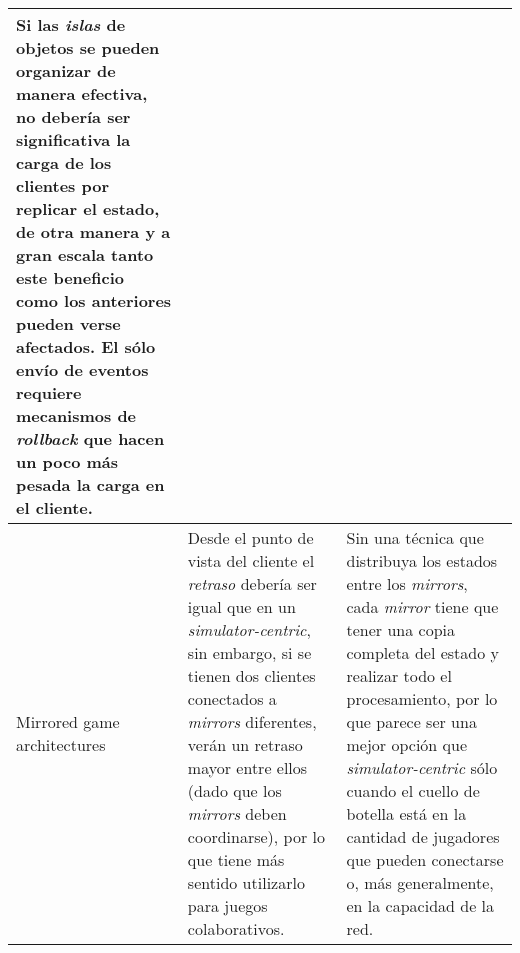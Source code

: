\begin{longtable}{|p{3cm}|p{6cm}|p{6cm}|}
Si las \emph{islas} de objetos se pueden organizar de manera efectiva, no debería ser significativa la carga de los clientes por replicar el estado, de otra manera y a gran escala tanto este beneficio como los anteriores pueden verse afectados. \newline El sólo envío de eventos requiere mecanismos de \emph{rollback} que hacen un poco más pesada la carga en el cliente. \\
\hline
Mirrored game architectures &
Desde el punto de vista del cliente el \emph{retraso} debería ser igual que en un \emph{simulator-centric}, sin embargo, si se tienen dos clientes conectados a \emph{mirrors} diferentes, verán un retraso mayor entre ellos (dado que los \emph{mirrors} deben coordinarse), por lo que tiene más sentido utilizarlo para juegos colaborativos.  &
Sin una técnica que distribuya los estados entre los \emph{mirrors}, cada \emph{mirror} tiene que tener una copia completa del estado y realizar todo el procesamiento, por lo que parece ser una mejor opción que \emph{simulator-centric} sólo cuando el cuello de botella está en la cantidad de jugadores que pueden conectarse o, más generalmente, en la capacidad de la red.\\
\hline
\end{longtable}
\normalsize



